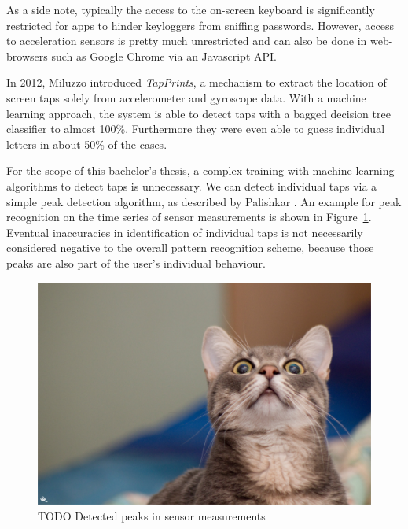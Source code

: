 As a side note, typically the access to the on-screen keyboard is significantly restricted for \glspl{app} to hinder keyloggers from sniffing passwords. However, access to acceleration sensors is pretty much unrestricted and can also be done in web-browsers such as Google Chrome via an Javascript API\cite{devicemotionjavascript}.

In 2012, Miluzzo \etal\cite{miluzzo2012tapprints} introduced \emph{TapPrints}, a mechanism to extract the location of screen taps solely from accelerometer and gyroscope data. With a machine learning approach, the system is able to detect taps with a bagged decision tree classifier to almost 100\%. Furthermore they were even able to guess individual letters in about 50\% of the cases.

For the scope of this bachelor's thesis, a complex training with machine learning algorithms to detect taps is unnecessary. We can detect individual taps via a simple peak detection algorithm, as described by Palishkar \etal\cite{palshikar2009simple}. An example for peak recognition on the time series of sensor measurements is shown in Figure~\ref{fig:peakdetection}. Eventual inaccuracies in identification of individual taps is not necessarily considered negative to the overall pattern recognition scheme, because those peaks are also part of the user's individual behaviour.

\begin{figure}
    \centering
    \includegraphics[width=\linewidth]{figures/lucifero_lolcat_by_fraterorion-d4q5ol0.jpg}
    \caption{TODO Detected peaks in sensor measurements}
    \label{fig:peakdetection}
\end{figure}

